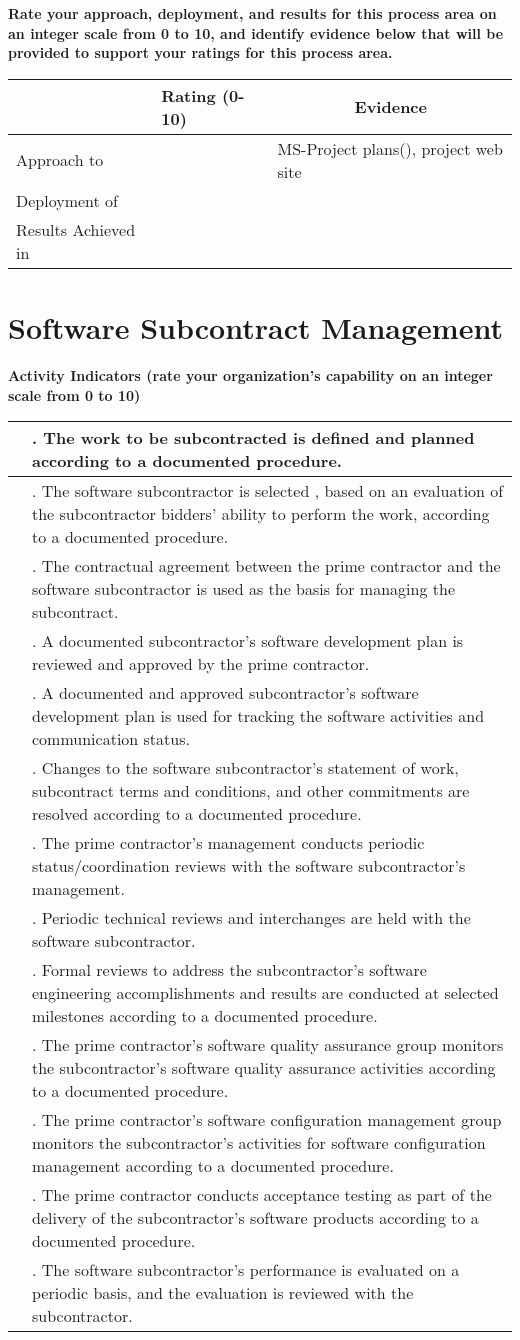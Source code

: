 \documentclass{article}
\newcommand{\KPAname}{}
\let\KPAsection=\section
\renewcommand{\section}[1]{\renewcommand{\KPAname}{#1}\KPAsection{#1}}
\newcounter{activity}[section]		%
\newcounter{approach}[section]
\newcounter{deployment}[section]
\newcounter{result}[section]
\newcounter{score}
\newenvironment{KPAActivity}
{
    {\bf Activity Indicators (rate your organization's capability
    on an integer scale from 0 to 10)} %
    \begin{center}
    \begin{tabular}{|p{0.5in}|p{6.0in}|} \hline %
}
{
    \end{tabular}
    \end{center}
    \setcounter{approach}{\value{approach}/\value{activity}}
    \setcounter{deployment}{\value{deployment}/\value{activity}}
    \setcounter{result}{\value{result}/\value{activity}}
}
\newcommand{\Activity}[4]
{
    \stepcounter{activity} 
    \setcounter{score}{(#1+#2+#3)/3}
    \setcounter{approach}{\value{approach}+#1}
    \setcounter{deployment}{\value{deployment}+#1}
    \setcounter{result}{\value{result}+#1}
    \arabic{score} & \arabic{activity}. #4 \\ \hline
} %
\newenvironment{KPARate}
{
    {\bf Rate your approach, deployment, and results for
    this process area on an integer scale from 0 to 10, and 
    identify evidence below that will be provided to support your
    ratings for this process area.}
    \begin{center}
    \begin{tabular}{|p{1.0in}|p{0.5in}|p{5.0in}|} \hline
    & Rating (0-10) & \multicolumn{1}{c|}{Evidence} \\ \hline
}
{
    \end{tabular}
    \end{center}
}
\newcommand{\Approach}[1]
{
    Approach to \KPAname & \arabic{approach} & #1 \\ \hline
}
\newcommand{\Deployment}[1]
{
    Deployment of \KPAname & \arabic{deployment} & #1 \\ \hline
}
\newcommand{\Results}[1]
{
    Results Achieved in \KPAname & \arabic{result} & #1 \\ \hline
}
\begin{document}
\begin{KPARate}
\Approach{MS-Project plans(), project web site}
\Deployment{}
\Results{}
\end{KPARate}

\newpage
\section{Software Subcontract Management}

\begin{KPAActivity}
\Activity{0}{0}{0}{The work to be subcontracted is defined and planned
according to a documented procedure.}
\Activity{0}{0}{0}{The software subcontractor is selected , based on an
evaluation of the subcontractor bidders' ability to perform the work,
according to a documented procedure.}
\Activity{5}{5}{5}{The contractual agreement between the prime contractor
and the software subcontractor is used as the basis for managing the
subcontract.}
\Activity{0}{0}{0}{A documented subcontractor's software development plan is
reviewed and approved by the prime contractor.}
\Activity{0}{0}{0}{A documented and approved subcontractor's software
development plan is used for tracking the software activities and
communication status.}
\Activity{1}{1}{1}{Changes to the software subcontractor's statement of
work, subcontract terms and conditions, and other commitments are
resolved according to a documented procedure.}
\Activity{3}{3}{3}{The prime contractor's management conducts periodic
status/coordination reviews with the software subcontractor's
management.}
\Activity{5}{5}{5}{Periodic technical reviews and interchanges are held with
the software subcontractor.}
\Activity{1}{1}{1}{Formal reviews to address the subcontractor's software
engineering accomplishments and results are conducted at selected
milestones according to a documented procedure.}
\Activity{0}{0}{0}{The prime contractor's software quality assurance group
monitors the subcontractor's software quality assurance activities
according to a documented procedure.}
\Activity{0}{0}{0}{The prime contractor's software configuration management
group monitors the subcontractor's activities for software
configuration management according to a documented procedure.}
\Activity{3}{3}{3}{The prime contractor conducts acceptance testing as part
of the delivery of the subcontractor's software products according to
a documented procedure.}
\Activity{4}{4}{4}{The software subcontractor's performance is evaluated on
a periodic basis, and the evaluation is reviewed with the
subcontractor.}
\end{KPAActivity}
\end{document}
